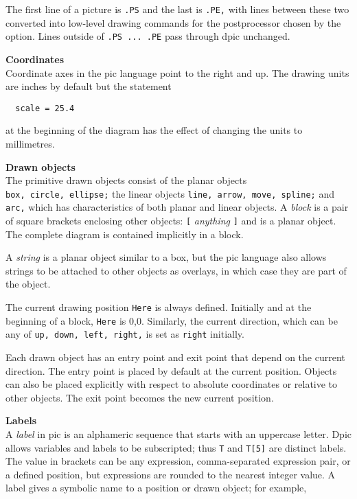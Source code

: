 The first line of a picture is
{\tt .PS}
and the last is
{\tt .PE,}
with lines between
these two converted into low-level drawing commands for the postprocessor
chosen by the option.
Lines outside of
{\tt .PS\ ...\ .PE}
pass through dpic unchanged.
\par\hskip-2pc{\bf Coordinates}\\
Coordinate axes in the pic
language point to the right and up.
The drawing units are inches by default but the statement

{\tt \ \ scale\ =\ 25.4}

at the beginning of the diagram has the effect of changing
the units to millimetres.
%
\par\hskip-2pc{\bf Drawn objects}\\
The primitive drawn objects consist of the planar objects
{\tt box,\ circle,\ ellipse;}
the linear objects
{\tt line,\ arrow,\ move,\ spline;}
and
{\tt arc,}
which has characteristics of both planar and linear objects.
A
{\it block}
is a pair of square brackets enclosing other objects:
{\tt [}
{\it anything}
{\tt ]}
and is a planar object.
The complete diagram is contained implicitly in a block.

A
{\it string}
is a planar object similar to a box,
but the
pic
language also allows strings to be attached to other objects as overlays,
in which case they are part of the object.

The current drawing position
{\tt Here}
is always defined. 
Initially and at the beginning of a block,
{\tt Here}
is 0,0.
Similarly, the current direction, which can be any of
{\tt up,\ down,\ left,\ right,}
is set as
{\tt right}
initially.

Each drawn object has an entry point and exit point that depend
on the current direction.
The entry point is placed by default at the current position. 
Objects can also be placed explicitly with respect to absolute
coordinates or relative to other objects.
The exit point becomes the new current position.
\par\hskip-2pc{\bf Labels}\\
A
{\it label}
in
pic
is an alphameric sequence that starts with an uppercase letter.
Dpic allows variables and labels to be subscripted; thus
{\tt T}
and
{\tt T[5]}
are distinct labels.
The value in brackets can be any expression, comma-separated
expression pair, or a defined position,
but expressions are rounded to the nearest integer value.
A label gives a symbolic name to a position or drawn object;
for example,

